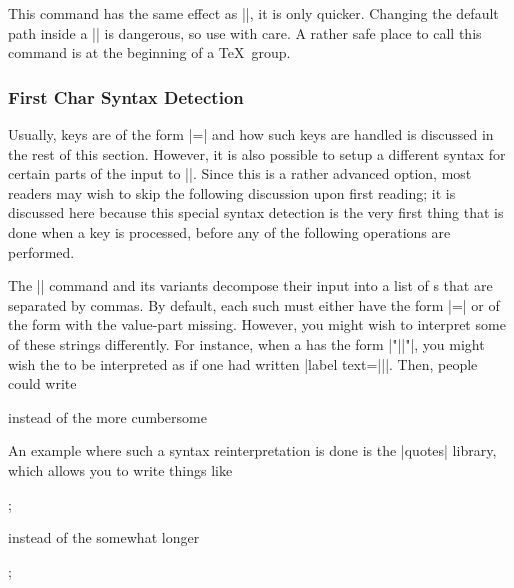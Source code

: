 \begin{command}{\pgfqkeysalso{}}
    This command has the same effect as ||, it is only quicker. Changing the default
    path inside a |\pgfkeyalso| is dangerous, so use with care. A rather safe
    place to call this command is at the beginning of a \TeX\ group.
\end{command}


\subsubsection{First Char Syntax Detection}
\label{sec:pgf:first:char:syntax}

Usually, keys are of the form |=| and how such keys are
handled is discussed in the rest of this section. However, it is also possible
to setup a different syntax for certain parts of the input to |\pgfkeys|. Since
this is a rather advanced option, most readers may wish to skip the following
discussion upon first reading; it is discussed here because this special syntax
detection is the very first thing that is done when a key is processed, before
any of the following operations are performed.

The |\pgfkeys| command and its variants decompose their input into a list of
s that are separated by commas. By default, each such
 must either have the form |=| or of the
form  with the value-part missing. However, you might wish to
interpret some of these strings differently. For instance, when a 
has the form |"||"|, you might wish the  to be
interpreted as if one had written |label text={||}|. Then, people
could write
%
\begin{codeexample}
\end{codeexample}
%
instead of the more cumbersome
%
\begin{codeexample}
\end{codeexample}
%
An example where such a syntax reinterpretation is done is the |quotes|
library, which allows you to write things like
%
\begin{codeexample}[preamble={\usetikzlibrary{graphs,quotes}}]
\tikz {};
\end{codeexample}
%
\noindent instead of the somewhat longer
%
\begin{codeexample}[preamble={\usetikzlibrary{graphs}}]
\tikz {};
\end{codeexample}

